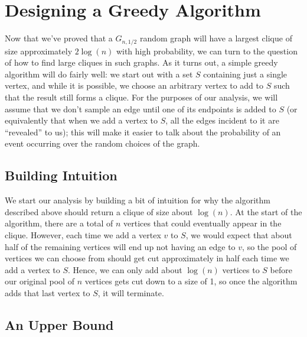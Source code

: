 \documentclass{article}
\begin{document}
\section{Designing a Greedy Algorithm}

Now that we've proved that a $G_{n, 1/2}$ random graph will have a largest clique of size approximately $2 \log(n)$ with high probability, we can turn to the question of how to find large cliques in such graphs.  As it turns out, a simple greedy algorithm will do fairly well: we start out with a set $S$ containing just a single vertex, and while it is possible, we choose an arbitrary vertex to add to $S$ such that the result still forms a clique.  For the purposes of our analysis, we will assume that we don't sample an edge until one of its endpoints is added to $S$ (or equivalently that when we add a vertex to $S$, all the edges incident to it are ``revealed'' to us); this will make it easier to talk about the probability of an event occurring over the random choices of the graph.

\subsection{Building Intuition}

We start our analysis by building a bit of intuition for why the algorithm described above should return a clique of size about $\log(n)$.  At the start of the algorithm, there are a total of $n$ vertices that could eventually appear in the clique.  However, each time we add a vertex $v$ to $S$, we would expect that about half of the remaining vertices will end up not having an edge to $v$, so the pool of vertices we can choose from should get cut approximately in half each time we add a vertex to $S$.  Hence, we can only add about $\log(n)$ vertices to $S$ before our original pool of $n$ vertices gets cut down to a size of 1, so once the algorithm adds that last vertex to $S$, it will terminate.


\subsection{An Upper Bound}
\end{document}
